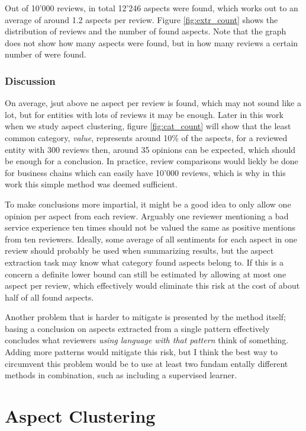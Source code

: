 \documentclass[a4paper,11pt]{kth-mag}
\begin{document}
Out of 10'000 reviews, in total 12'246 aspects were found, which works out to an average of around 1.2 aspects per review. Figure \ref{fig:extr_count} shows the distribution of reviews and the number of found aspects. Note that the graph does not show how many aspects were found, but in how many reviews a certain number of were found.

\section{Discussion}

On average, jsut above ne aspect per review is found, which may not sound like a lot, but for entities with lots of reviews it may be enough. Later in this work when we study aspect clustering, figure \ref{fig:cat_count} will show that the least common category, \emph{value}, represents around 10\% of the aspects, for a reviewed entity with 300 reviews then, around 35 opinions can be expected, which should be enough for a conclusion. In practice, review comparisons would liekly be done for business chains which can easily have 10'000 reviews, which is why in this work this simple method was deemed sufficient.

To make conclusions more impartial, it might be a good idea to only allow one opinion per aspect from each review. Arguably one reviewer mentioning a bad service experience ten times should not be valued the same as positive mentions from ten reviewers. Ideally, some average of all sentiments for  each aspect in one review should probably be used when summarizing results, but the aspect extraction task may know what category found aspects belong to. If this is a concern a definite lower bound can still be estimated by allowing at most one aspect per review, which effectively would eliminate this risk at the cost of about half of all found aspects.

Another problem that is harder to mitigate is presented by the method itself; basing a conclusion on aspects extracted from a single pattern effectively concludes what reviewers \emph{using language with that pattern} think of something. Adding more patterns would mitigate this risk, but I think the best way to circumvent this problem would be to use at least two fundam
entally different methods in combination, such as including a supervised learner.


\part{Aspect Clustering}
\end{document}
